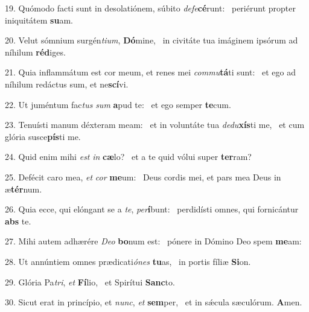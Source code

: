 19. Quómodo facti sunt in desolatiónem, súbito \textit{de}\textit{fe}\textbf{cé}runt: \ast\  periérunt propter iniquitátem \textbf{su}am.\

20. Velut sómnium surgén\textit{ti}\textit{um}, \textbf{Dó}mine, \ast\  in civitáte tua imáginem ipsórum ad níhilum \textbf{réd}iges.\

21. Quia inflammátum est cor meum, et renes mei \textit{com}\textit{mu}\textbf{tá}ti sunt: \ast\  et ego ad níhilum redáctus sum, et ne\textbf{scí}vi.\

22. Ut juméntum fac\textit{tus} \textit{sum} \textbf{a}pud te: \ast\  et ego semper \textbf{te}cum.\

23. Tenuísti manum déxteram meam: \dag\  et in voluntáte tua \textit{de}\textit{du}\textbf{xís}ti me, \ast\  et cum glória susce\textbf{pís}ti me.\

24. Quid enim mihi \textit{est} \textit{in} \textbf{cæ}lo? \ast\  et a te quid vólui super \textbf{ter}ram?\

25. Defécit caro mea, \textit{et} \textit{cor} \textbf{me}um: \ast\  Deus cordis mei, et pars mea Deus in æ\textbf{tér}num.\

26. Quia ecce, qui elóngant se a \textit{te}, \textit{per}\textbf{í}bunt: \ast\  perdidísti omnes, qui fornicántur \textbf{abs} te.\

27. Mihi autem adhærére \textit{De}\textit{o} \textbf{bo}num est: \ast\  pónere in Dómino Deo spem \textbf{me}am:\

28. Ut annúntiem omnes prædicati\textit{ó}\textit{nes} \textbf{tu}as, \ast\  in portis fíliæ \textbf{Si}on.\

29. Glória Pa\textit{tri}, \textit{et} \textbf{Fí}lio, \ast\  et Spirítui \textbf{Sanc}to.\

30. Sicut erat in princípio, et \textit{nunc}, \textit{et} \textbf{sem}per, \ast\  et in sǽcula sæculórum. \textbf{A}men.\

